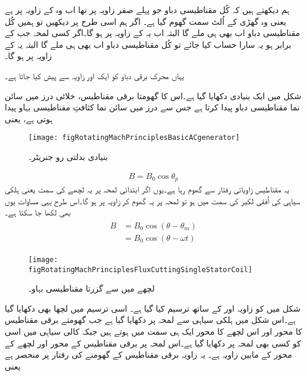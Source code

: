 ہم دیکھتے ہیں کہ کُل مقناطیسی دباو جو پہلے صفر زاویہ پر تھا اب وہ   کے زاویہ پر ہے یعنی وہ گھڑی کے اُلٹ سمت گھوم گیا ہے۔ اگر ہم اسی طرح  پر دیکھیں تو ہمیں کُل مقناطیسی دباو اب بھی  ہی ملے گا البتہ اب یہ  کے زاویہ پر ہو گا۔اگر کسی لمحہ جب  کے برابر ہو یہ سارا حساب کیا جائے تو کُل مقناطیسی دباو اب بھی  ہی ملے گا البتہ یہ  کے زاویہ پر ہو گا۔

یہاں محرک برقی دباو کو ایک اور زاویہ سے پیش کیا جاتا ہے۔

شکل   میں ایک بنیادی  دکھایا گیا ہے۔اس کا گھومتا برقی مقناطیس، خلائی درز میں سائن نما مقناطیسی دباو  پیدا کرتا ہے جس سے  درز میں سائن نما کثافتِ مقناطیسی بہاو   پیدا ہوتی ہے، یعنی
\begin{figure}
\centering
\texttt{[image: figRotatingMachPrinciplesBasicACgenerator]}
\caption{بنیادی بدلتی رو جنریٹر۔}
\label{شکل_گھومتے_مشین_بنیادی_بدلتی_رو_جنریٹر}
\end{figure}
%
\begin{align}
B=B_0 \cos \theta_p
\end{align}
یہ مقناطیس  زاویاتی رفتار سے گھوم رہا ہے۔یوں اگر ابتدائی لمحہ   پر  یہ  لچھے کی سمت یعنی ہلکی سیاہی کی  اُفقی لکیر کی سمت میں ہو تو لمحہ   پر یہ گھوم کر زاویہ  پر ہو گا۔اس طرح یہی مساوات  یوں بھی لکھا جا سکتا ہے۔
\begin{gather}
\begin{aligned}\label{مساوات_گھومتے_مشین_کثافت_بالمقابل_زاویہ}
B&=B_0 \cos (\theta-\theta_m)\\
&=B_0 \cos (\theta -\omega t)
\end{aligned}
\end{gather}
%
\begin{figure}
\centering
\texttt{[image: figRotatingMachPrinciplesFluxCuttingSingleStatorCoil]}
\caption{لچھے میں سے گزرتا مقناطیسی بہاو۔}
\label{شکل_گھومتے_مشین_لچھے_سے_گزرتی_بیاو}
\end{figure}
%
شکل   میں  کو زاویہ  اور   کے ساتھ ترسیم کیا گیا ہے۔ اسی ترسیم میں لچھا  بھی دکھایا گیا ہے۔اس شکل میں ہلکی سیاہی سے لمحہ  پر  دکھایا گیا ہے جب گھومتے برقی مقناطیس کا محور اور اس لچھے کا محور ایک ہی سمت میں ہوتے ہیں جبکہ کالی سیاہی میں اسی  کو کسی  بھی لمحہ  پر دکھایا گیا ہے۔اس لمحہ پر برقی مقناطیس کے محور اور لچھے کے محور کے مابین  زاویہ ہے۔ یہ زاویہ برقی مقناطیس کے گھومنے کی رفتار  پر منحصر ہے یعنی
